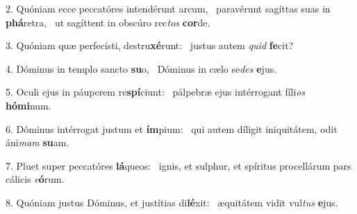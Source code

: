 2. Quóniam ecce peccatóres intendérunt arcum, \dag\  paravérunt sagíttas suas in \textbf{phá}retra, \ast\  ut sagíttent in obscúro rec\textit{tos} \textbf{cor}de.\

3. Quóniam quæ perfecísti, destru\textbf{xé}runt: \ast\  justus autem \textit{quid} \textbf{fe}cit?\

4. Dóminus in templo sancto \textbf{su}o, \ast\  Dóminus in cælo se\textit{des} \textbf{e}jus.\

5. Oculi ejus in páuperem re\textbf{spí}ciunt: \ast\  pálpebræ ejus intérrogant fíli\textit{os} \textbf{hó}\textbf{mi}num.\

6. Dóminus intérrogat justum et \textbf{ím}pium: \ast\  qui autem díligit iniquitátem, odit áni\textit{mam} \textbf{su}am.\

7. Pluet super peccatóres \textbf{lá}queos: \ast\  ignis, et sulphur, et spíritus procellárum pars cálicis \textit{e}\textbf{ó}rum.\

8. Quóniam justus Dóminus, et justítias di\textbf{lé}xit: \ast\  æquitátem vidit vul\textit{tus} \textbf{e}jus.\

